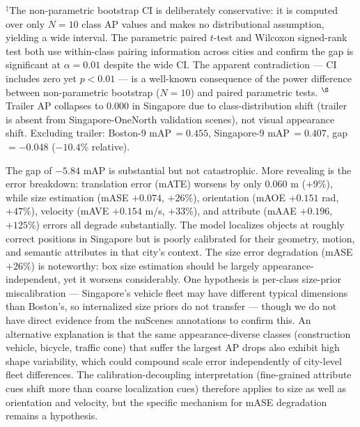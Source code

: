 \documentclass[letterpaper, 10pt, journal]{IEEEtran}
\begin{document}
\noindent\footnotesize{$^{\ddagger}$The non-parametric bootstrap CI is deliberately
conservative: it is computed over only $N{=}10$ class AP values and makes no
distributional assumption, yielding a wide interval.
The parametric paired $t$-test and Wilcoxon signed-rank test both use within-class
pairing information across cities and confirm the gap is significant at
$\alpha{=}0.01$ despite the wide CI.
The apparent contradiction --- CI includes zero yet $p{<}0.01$ --- is a well-known
consequence of the power difference between non-parametric bootstrap ($N{=}10$)
and paired parametric tests.
$^{\S}$Trailer AP collapses to $0.000$ in Singapore due to class-distribution
shift (trailer is absent from Singapore-OneNorth validation scenes), not visual
appearance shift. Excluding trailer: Boston-9 mAP\,$= 0.455$, Singapore-9
mAP\,$= 0.407$, gap\,$= -0.048$ ($-10.4\%$ relative).}

The gap of $-5.84$ mAP is substantial but not catastrophic.
More revealing is the error breakdown: translation error (mATE) worsens by only
$0.060$ m ($+9\%$), while size estimation (mASE $+0.074$, $+26\%$), orientation
(mAOE $+0.151$ rad, $+47\%$), velocity (mAVE $+0.154$ m/s, $+33\%$), and attribute
(mAAE $+0.196$, $+125\%$) errors all degrade substantially.
The model localizes objects at roughly correct positions in Singapore but is poorly
calibrated for their geometry, motion, and semantic attributes in that city's context.
The size error degradation (mASE $+26\%$) is noteworthy: box size estimation should
be largely appearance-independent, yet it worsens considerably.
One hypothesis is per-class size-prior miscalibration --- Singapore's vehicle fleet
may have different typical dimensions than Boston's, so internalized size priors
do not transfer --- though we do not have direct evidence from the nuScenes
annotations to confirm this.
An alternative explanation is that the same appearance-diverse classes
(construction vehicle, bicycle, traffic cone) that suffer the largest AP drops also
exhibit high shape variability, which could compound scale error independently of
city-level fleet differences.
The calibration-decoupling interpretation (fine-grained attribute cues shift more than
coarse localization cues) therefore applies to size as well as orientation and velocity,
but the specific mechanism for mASE degradation remains a hypothesis.
\end{document}
